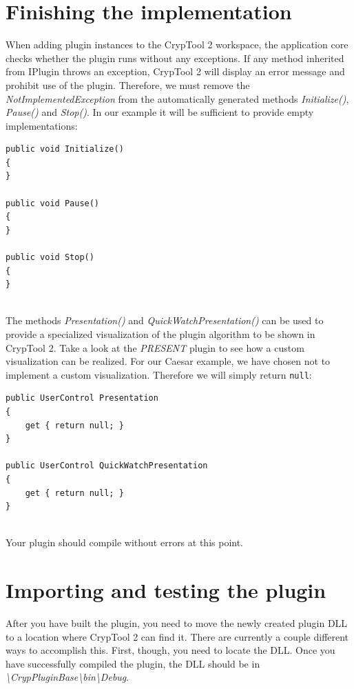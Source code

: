 \section{Finishing the implementation}
\label{sec:FinishingTheImplementation}

When adding plugin instances to the CrypTool 2 workspace, the application core checks whether the plugin runs without any exceptions. If any method inherited from IPlugin throws an exception, CrypTool 2 will display an error message and prohibit use of the plugin. Therefore, we must remove the \textit{NotImplementedException} from the automatically generated methods \textit{Initialize()}, \textit{Pause()} and \textit{Stop()}. In our example it will be sufficient to provide empty implementations:

\begin{lstlisting}
public void Initialize()
{
}

public void Pause()
{
}

public void Stop()
{
}
\end{lstlisting}

\ \\
The methods \textit{Presentation()} and \textit{QuickWatchPresentation()} can be used to provide a specialized visualization of the plugin algorithm to be shown in CrypTool 2. Take a look at the \textit{PRESENT} plugin to see how a custom visualization can be realized. For our Caesar example, we have chosen not to implement a custom visualization. Therefore we will simply return \texttt{null}:

\begin{lstlisting}
public UserControl Presentation
{
	get { return null; }
}

public UserControl QuickWatchPresentation
{
	get { return null; }
}
\end{lstlisting}

\ \\
Your plugin should compile without errors at this point.
\clearpage

\section{Importing and testing the plugin}
\label{sec:ImportingAndTestingThePlugin}

After you have built the plugin, you need to move the newly created plugin DLL to a location where CrypTool 2 can find it. There are currently a couple different ways to accomplish this. First, though, you need to locate the DLL. Once you have successfully compiled the plugin, the DLL should be in \textit{\mbox{\textbackslash CrypPluginBase\textbackslash }bin\textbackslash Debug}.


